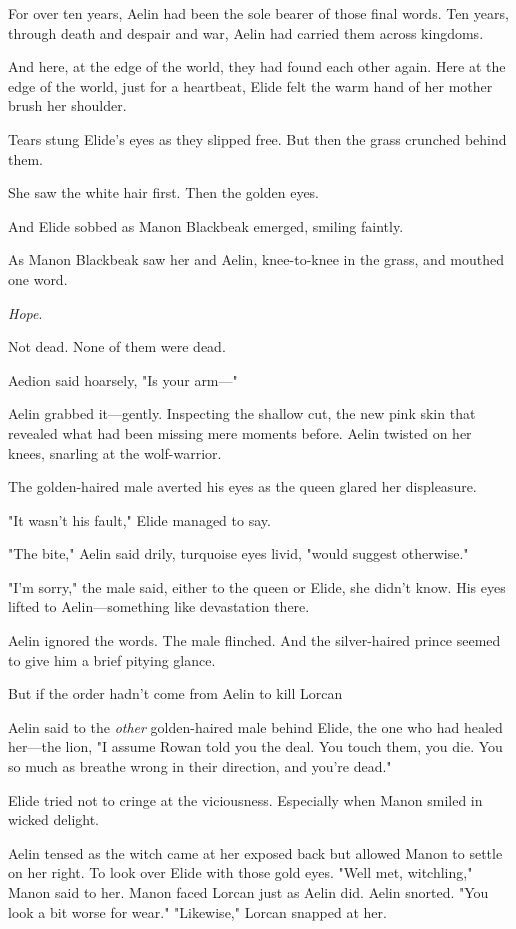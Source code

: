 For over ten years, Aelin had been the sole bearer of those final words.
Ten years, through death and despair and war, Aelin had carried them across kingdoms.

And here, at the edge of the world, they had found each other again.
Here at the edge of the world, just for a heartbeat, Elide felt the warm hand of her mother brush her shoulder.

Tears stung Elide's eyes as they slipped free.
But then the grass crunched behind them.

She saw the white hair first.
Then the golden eyes.

And Elide sobbed as Manon Blackbeak emerged, smiling faintly.

As Manon Blackbeak saw her and Aelin, knee-to-knee in the grass, and mouthed one word.

\emph{Hope}.

Not dead.
None of them were dead.

Aedion said hoarsely, "Is your arm---"

Aelin grabbed it---gently.
Inspecting the shallow cut, the new pink skin that revealed what had been missing mere moments before.
Aelin twisted on her knees, snarling at the wolf-warrior.

The golden-haired male averted his eyes as the queen glared her displeasure.

"It wasn't his fault," Elide managed to say.

"The bite," Aelin said drily, turquoise eyes livid, "would suggest otherwise."

"I'm sorry," the male said, either to the queen or Elide, she didn't know.
His eyes lifted to Aelin---something like devastation there.

Aelin ignored the words.
The male flinched.
And the silver-haired prince seemed to give him a brief pitying glance.

But if the order hadn't come from Aelin to kill Lorcan 

Aelin said to the \emph{other} golden-haired male behind Elide, the one who had healed her---the lion, "I assume Rowan told you the deal.
You touch them, you die.
You so much as breathe wrong in their direction, and you're dead."

Elide tried not to cringe at the viciousness.
Especially when Manon smiled in wicked delight.

Aelin tensed as the witch came at her exposed back but allowed Manon to settle on her right.
To look over Elide with those gold eyes.
"Well met, witchling," Manon said to her.
Manon faced Lorcan just as Aelin did.
Aelin snorted.
"You look a bit worse for wear."
"Likewise," Lorcan snapped at her.

